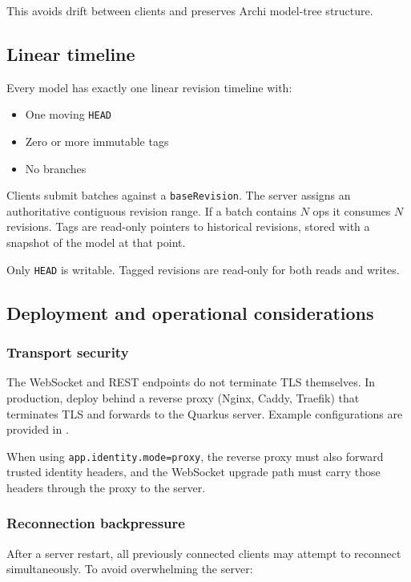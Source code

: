 This avoids drift between clients and preserves Archi model-tree structure.

\subsection{Linear timeline}

Every model has exactly one linear revision timeline with:

\begin{itemize}
\item One moving \texttt{HEAD}
\item Zero or more immutable tags
\item No branches
\end{itemize}

Clients submit batches against a \texttt{baseRevision}. The server assigns an
authoritative contiguous revision range. If a batch contains \(N\) ops it
consumes \(N\) revisions. Tags are read-only pointers to historical revisions,
stored with a snapshot of the model at that point.

Only \texttt{HEAD} is writable. Tagged revisions are read-only for both reads
and writes.

\subsection{Deployment and operational considerations}

\subsubsection{Transport security}

The WebSocket and REST endpoints do not terminate TLS themselves. In production,
deploy behind a reverse proxy (Nginx, Caddy, Traefik) that terminates TLS and
forwards to the Quarkus server. Example configurations are provided in
.

When using \texttt{app.identity.mode=proxy}, the reverse proxy must also
forward trusted identity headers, and the WebSocket upgrade path must carry
those headers through the proxy to the server.

\subsubsection{Reconnection backpressure}

After a server restart, all previously connected clients may attempt to
reconnect simultaneously. To avoid overwhelming the server:

